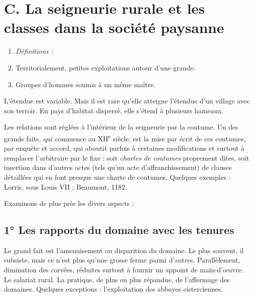 \documentclass[french,twoside]{book} %
\newlength{\listmod}
\newcommand{\listhead}[1]{\hspace{-1\listmod}\emph{#1}}
\begin{document}
\section[C. La seigneurie rurale et les classes dans la société paysanne]{C. La seigneurie rurale et les classes dans la société paysanne \protect\footnotemark}
\label{c07c}

\begin{enumerate}[itemsep=0pt,]
\item[]\listhead{Définitions :}
\item Territorialement, petites exploitations autour d’une grande.
\item Groupes d’hommes soumis à un même maître.

\end{enumerate}\noindent L’étendue est variable. Mais il est rare qu’elle atteigne l’étendue d’un village avec son terroir. En pays d’habitat dispersé, elle s’étend à plusieurs hameaux.\par
Les relations sont réglées à l’intérieur de la seigneurie par la coutume. Un des grands faits, qui commence au XII\textsuperscript{e} siècle, est la mise par écrit de ces coutumes, par enquête et accord, qui aboutit parfois à certaines modifications et surtout à remplacer l’arbitraire  
\label{p57} par le fixe : soit \emph{chartes de coutumes} proprement dites, soit insertion dans d’autres actes (tels qu’un acte d’affranchissement) de clauses détaillées qui en font presque une charte de coutumes. Quelques exemples : Lorris, sous Louis VII ; Beaumont, 1182.\par
Examinons de plus près les divers aspects :\par
\subsection[1° Les rapports du domaine avec les tenures]{1° Les rapports du domaine avec les tenures}
\noindent Le grand fait est l’amenuisement ou disparition du domaine. Le plus souvent, il subsiste, mais ce n’est plus qu’une grosse ferme parmi d’autres. Parallèlement, diminution des corvées, réduites surtout à fournir un appoint de main-d’œuvre. Le salariat rural. La pratique, de plus en plus répandue, de l’affermage des domaines. Quelques exceptions : l’exploitation des abbayes cisterciennes.
\end{document}
